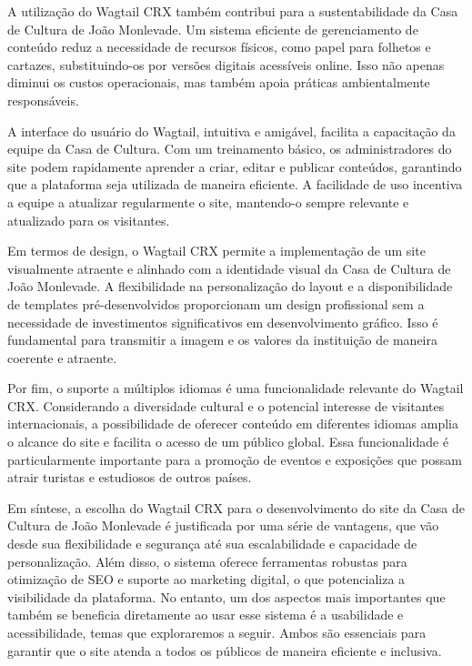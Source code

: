 A utilização do Wagtail CRX também contribui para a sustentabilidade da Casa de Cultura de João Monlevade. Um sistema eficiente de gerenciamento de conteúdo reduz a necessidade de recursos físicos, como papel para folhetos e cartazes, substituindo-os por versões digitais acessíveis online. Isso não apenas diminui os custos operacionais, mas também apoia práticas ambientalmente responsáveis.

A interface do usuário do Wagtail, intuitiva e amigável, facilita a capacitação da equipe da Casa de Cultura. Com um treinamento básico, os administradores do site podem rapidamente aprender a criar, editar e publicar conteúdos, garantindo que a plataforma seja utilizada de maneira eficiente. A facilidade de uso incentiva a equipe a atualizar regularmente o site, mantendo-o sempre relevante e atualizado para os visitantes.

Em termos de design, o Wagtail CRX permite a implementação de um site visualmente atraente e alinhado com a identidade visual da Casa de Cultura de João Monlevade. A flexibilidade na personalização do layout e a disponibilidade de templates pré-desenvolvidos proporcionam um design profissional sem a necessidade de investimentos significativos em desenvolvimento gráfico. Isso é fundamental para transmitir a imagem e os valores da instituição de maneira coerente e atraente.

Por fim, o suporte a múltiplos idiomas é uma funcionalidade relevante do Wagtail CRX. Considerando a diversidade cultural e o potencial interesse de visitantes internacionais, a possibilidade de oferecer conteúdo em diferentes idiomas amplia o alcance do site e facilita o acesso de um público global. Essa funcionalidade é particularmente importante para a promoção de eventos e exposições que possam atrair turistas e estudiosos de outros países.

Em síntese, a escolha do Wagtail CRX para o desenvolvimento do site da Casa de Cultura de João Monlevade é justificada por uma série de vantagens, que vão desde sua flexibilidade e segurança até sua escalabilidade e capacidade de personalização. Além disso, o sistema oferece ferramentas robustas para otimização de \ac{SEO} e suporte ao marketing digital, o que potencializa a visibilidade da plataforma. No entanto, um dos aspectos mais importantes que também se beneficia diretamente ao usar esse sistema é a usabilidade e acessibilidade, temas que exploraremos a seguir. Ambos são essenciais para garantir que o site atenda a todos os públicos de maneira eficiente e inclusiva.

